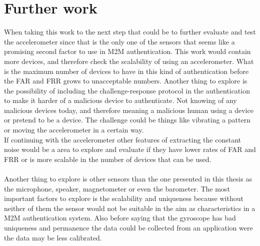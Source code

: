 \section{Further work}\label{sec:further}
When taking this work to the next step that could be to further evaluate and test the accelerometer since that is the only one of the sensors that seems like a promising second factor to use in M2M authentication. This work would contain more devices, and therefore check the scalability of using an accelerometer. What is the maximum number of devices to have in this kind of authentication before the FAR and FRR grows to unacceptable numbers. Another thing to explore is the possibility of including the challenge-response protocol in the authentication to make it harder of a malicious device to authenticate. Not knowing of any malicious devices today, and therefore meaning a malicious human using a device or pretend to be a device. The challenge could be things like vibrating a pattern or moving the accelerometer in a certain way.\\
If continuing with the accelerometer other features of extracting the constant noise would be a area to explore and evaluate if they have lower rates of FAR and FRR or is more scalable in the number of devices that can be used. \\
\\
Another thing to explore is other sensors than the one presented in this thesis as the microphone, speaker, magnetometer or even the barometer. The most important factors to explore is the scalability and uniqueness because without neither of them the sensor would not be suitable in the aim as characteristics in a M2M authentication system. Also before saying that the gyroscope has bad uniqueness and permanence the data could be collected from an application were the data may be less calibrated.